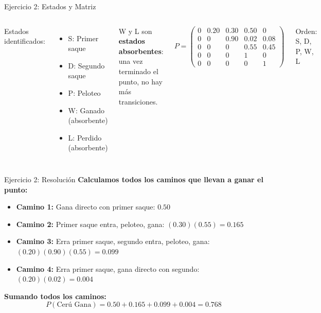 \documentclass{beamer}
\begin{document}
\begin{frame}{Ejercicio 2: Estados y Matriz}
    \small
    \begin{columns}
        Estados identificados:
        \begin{itemize}
            \item S: Primer saque
            \item D: Segundo saque
            \item P: Peloteo
            \item W: Ganado (absorbente)
            \item L: Perdido (absorbente)
        \end{itemize}

        \vspace{0.5em}

        W y L son \textbf{estados absorbentes}: una vez terminado el punto, no hay más transiciones.

        \[P = \begin{pmatrix}
        0 & 0.20 & 0.30 & 0.50 & 0 \\
        0 & 0 & 0.90 & 0.02 & 0.08 \\
        0 & 0 & 0 & 0.55 & 0.45 \\
        0 & 0 & 0 & 1 & 0 \\
        0 & 0 & 0 & 0 & 1
        \end{pmatrix}\]

        \vspace{0.3em}

        Orden: S, D, P, W, L
    \end{columns}
\end{frame}

\begin{frame}{Ejercicio 2: Resolución}
    \small
    \textbf{Calculamos todos los caminos que llevan a ganar el punto:}

    \vspace{0.5em}

    \begin{itemize}
        \item \textbf{Camino 1:} Gana directo con primer saque: $0.50$
        \item \textbf{Camino 2:} Primer saque entra, peloteo, gana: $(0.30)(0.55) = 0.165$
        \item \textbf{Camino 3:} Erra primer saque, segundo entra, peloteo, gana: $(0.20)(0.90)(0.55) = 0.099$
        \item \textbf{Camino 4:} Erra primer saque, gana directo con segundo: $(0.20)(0.02) = 0.004$
    \end{itemize}

    \vspace{0.5em}

    \textbf{Sumando todos los caminos:}
    \[
    P(\text{Cerú Gana}) = 0.50 + 0.165 + 0.099 + 0.004 = 0.768
    \]
\end{frame}
\end{document}

